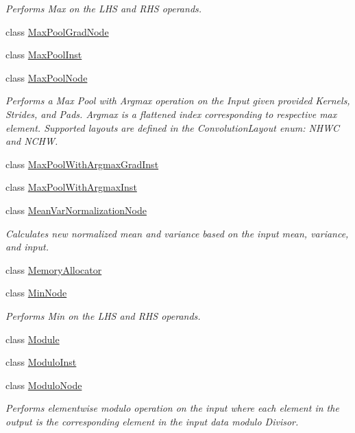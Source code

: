 \begin{DoxyCompactItemize}
\begin{DoxyCompactList}\small\item\em Performs Max on the L\+HS and R\+HS operands. \end{DoxyCompactList}\item 
class \hyperlink{classglow_1_1_max_pool_grad_node}{Max\+Pool\+Grad\+Node}
\item 
class \hyperlink{classglow_1_1_max_pool_inst}{Max\+Pool\+Inst}
\item 
class \hyperlink{classglow_1_1_max_pool_node}{Max\+Pool\+Node}
\begin{DoxyCompactList}\small\item\em Performs a Max Pool with Argmax operation on the Input given provided Kernels, Strides, and Pads. Argmax is a flattened index corresponding to respective max element. Supported layouts are defined in the Convolution\+Layout enum\+: N\+H\+WC and N\+C\+HW. \end{DoxyCompactList}\item 
class \hyperlink{classglow_1_1_max_pool_with_argmax_grad_inst}{Max\+Pool\+With\+Argmax\+Grad\+Inst}
\item 
class \hyperlink{classglow_1_1_max_pool_with_argmax_inst}{Max\+Pool\+With\+Argmax\+Inst}
\item 
class \hyperlink{classglow_1_1_mean_var_normalization_node}{Mean\+Var\+Normalization\+Node}
\begin{DoxyCompactList}\small\item\em Calculates new normalized mean and variance based on the input mean, variance, and input. \end{DoxyCompactList}\item 
class \hyperlink{classglow_1_1_memory_allocator}{Memory\+Allocator}
\item 
class \hyperlink{classglow_1_1_min_node}{Min\+Node}
\begin{DoxyCompactList}\small\item\em Performs Min on the L\+HS and R\+HS operands. \end{DoxyCompactList}\item 
class \hyperlink{classglow_1_1_module}{Module}
\item 
class \hyperlink{classglow_1_1_modulo_inst}{Modulo\+Inst}
\item 
class \hyperlink{classglow_1_1_modulo_node}{Modulo\+Node}
\begin{DoxyCompactList}\small\item\em Performs elementwise modulo operation on the input where each element in the output is the corresponding element in the input data modulo Divisor. \end{DoxyCompactList}\item 

\end{DoxyCompactItemize}
